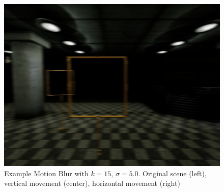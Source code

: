 \begin{figure}[htbp]
\begin{minipage}{0.33\textwidth}
		\includegraphics[width=\textwidth]{fig/gate_example_motionblur_h}
	\end{minipage}
	\caption{Example Motion Blur with $k=15$, $\sigma=5.0$. Original scene (left), vertical movement (center), horizontal movement (right)}
	\label{fig:motionblur}
\end{figure}


